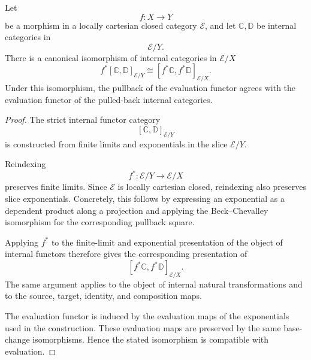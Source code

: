 \begin{lemma}
\label{lem:base-change-internal-functor-categories}
    Let
    \[
        f:X\to Y
    \]
    be a morphism in a locally cartesian closed category \(\mathcal E\), and
    let \(\mathbb C,\mathbb D\) be internal categories in
    \[
        \mathcal E/Y.
    \]
    There is a canonical isomorphism of internal categories in
    \(\mathcal E/X\)
    \[
        f^*
        [\mathbb C,\mathbb D]_{\mathcal E/Y}
        \cong
        [f^*\mathbb C,f^*\mathbb D]_{\mathcal E/X}.
    \]
    Under this isomorphism, the pullback of the evaluation functor agrees
    with the evaluation functor of the pulled-back internal categories.
\end{lemma}
\begin{proof}
    The strict internal functor category
    \[
        [\mathbb C,\mathbb D]_{\mathcal E/Y}
    \]
    is constructed from finite limits and exponentials in the slice
    \(\mathcal E/Y\).

    Reindexing
    \[
        f^*:\mathcal E/Y\to\mathcal E/X
    \]
    preserves finite limits. Since \(\mathcal E\) is locally cartesian
    closed, reindexing also preserves slice exponentials. Concretely, this
    follows by expressing an exponential as a dependent product along a
    projection and applying the Beck--Chevalley isomorphism for the
    corresponding pullback square.

    Applying \(f^*\) to the finite-limit and exponential presentation of the
    object of internal functors therefore gives the corresponding
    presentation of
    \[
        [f^*\mathbb C,f^*\mathbb D]_{\mathcal E/X}.
    \]
    The same argument applies to the object of internal natural
    transformations and to the source, target, identity, and composition
    maps.

    The evaluation functor is induced by the evaluation maps of the
    exponentials used in the construction. These evaluation maps are
    preserved by the same base-change isomorphisms. Hence the stated
    isomorphism is compatible with evaluation.
\end{proof}

